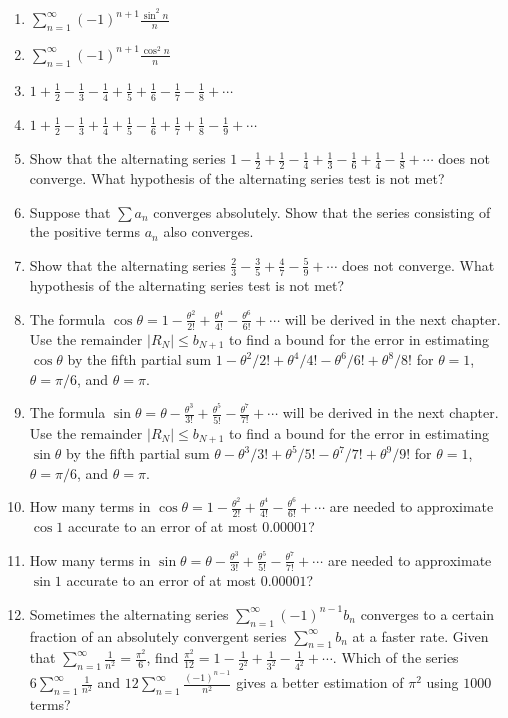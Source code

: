 \documentclass{exercises}
\begin{document}
\begin{enumerate}[resume]
\item $\sum_{n=1}^{\infty}{(-1)}^{n+1}\frac{\sin^{2}n}{n}$
\item $\sum_{n=1}^{\infty}{(-1)}^{n+1}\frac{\cos^{2}n}{n}$
\item $1+\frac{1}{2}-\frac{1}{3}-\frac{1}{4}+\frac{1}{5}+\frac{1}{6}-\frac{1}{7}-\frac{1}{8}+\cdots$
\item $1+\frac{1}{2}-\frac{1}{3}+\frac{1}{4}+\frac{1}{5}-\frac{1}{6}+\frac{1}{7}+\frac{1}{8}-\frac{1}{9}+\cdots$
\item Show that the alternating series $1-\frac{1}{2}+\frac{1}{2}-\frac{1}{4}+\frac{1}{3}-\frac{1}{6}+\frac{1}{4}-\frac{1}{8}+\cdots$ does not converge. What hypothesis of the alternating series test is not met?
\item Suppose that $\sum a_{n}$ converges absolutely. Show that the series consisting of the positive terms $a_{n}$ also converges.
\item Show that the alternating series $\frac{2}{3}-\frac{3}{5}+\frac{4}{7}-\frac{5}{9}+\cdots$ does not converge. What hypothesis of the alternating series test is not met?
\item The formula $\cos \theta=1-\frac{\theta^{2}}{2!}+\frac{\theta^{4}}{4!}-\frac{\theta^{6}}{6!}+\cdots$ will be derived in the next chapter. Use the remainder $|R_{N}|\le b_{N+1}$ to find a bound for the error in estimating $\cos \theta$ by the fifth partial sum $1-\theta^{2}/2!+\theta^{4}/4!-\theta^{6}/6!+\theta^{8}/8!$ for $\theta=1$, $\theta=\pi/6$, and $\theta=\pi$.
\item The formula $\sin \theta=\theta-\frac{\theta^{3}}{3!}+\frac{\theta^{5}}{5!}-\frac{\theta^{7}}{7!}+\cdots$ will be derived in the next chapter. Use the remainder $|R_{N}|\le b_{N+1}$ to find a bound for the error in estimating $\sin \theta$ by the fifth partial sum $\theta-\theta^{3}/3!+\theta^{5}/5!-\theta^{7}/7!+\theta^{9}/9!$ for $\theta=1$, $\theta=\pi/6$, and $\theta=\pi$.
\item How many terms in $\cos \theta=1-\frac{\theta^{2}}{2!}+\frac{\theta^{4}}{4!}-\frac{\theta^{6}}{6!}+\cdots$ are needed to approximate $\cos 1$ accurate to an error of at most $0.00001$?
\item How many terms in $\sin \theta=\theta-\frac{\theta^{3}}{3!}+\frac{\theta^{5}}{5!}-\frac{\theta^{7}}{7!}+\cdots$ are needed to approximate $\sin 1$ accurate to an error of at most $0.00001$?
\item Sometimes the alternating series $\sum_{n=1}^{\infty}{(-1)}^{n-1}b_{n}$ converges to a certain fraction of an absolutely convergent series $\sum_{n=1}^{\infty}b_{n}$ at a faster rate. Given that $\sum_{n=1}^{\infty}\frac{1}{n^{2}}=\frac{\pi^{2}}{6}$, find $\frac{\pi^{2}}{12}=1-\frac{1}{2^{2}}+\frac{1}{3^{2}}-\frac{1}{4^{2}}+\cdots$. Which of the series $6\sum_{n=1}^{\infty}\frac{1}{n^{2}}$ and $12\sum_{n=1}^{\infty}\frac{{(-1)}^{n-1}}{n^{2}}$ gives a better estimation of $\pi^{2}$ using $1000$ terms?
\end{enumerate}
\end{document}
